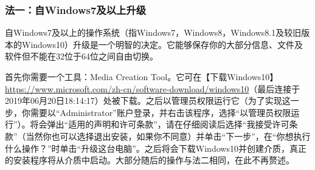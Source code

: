 \subsubsection{法一：自Windows7及以上升级}
自Windows7及以上的操作系统（指Windows7，Windows8，Windows8.1及较旧版本的Windows10）升级是一个明智的决定。它能够保存你的大部分信息、文件及软件但不能在32位于64位之间自由切换。\par
首先你需要一个工具：Media Creation Tool。它可在【下载Windows10】\url{https://www.microsoft.com/zh-cn/software-download/windows10}（最后连接于2019年06月20日18:14:17）处被下载。之后以管理员权限运行它（为了实现这一步，你需要以“Administrator”账户登录，并右击该程序，选择“以管理员权限运行”）。将会弹出“适用的声明和许可条款”，请在{\color{red}仔细阅读}后选择“我接受许可条款”（当然你也可以选择退出安装，如果你不同意）并单击“下一步”，在“你想执行什么操作？”时单击“升级这台电脑”。之后将会下载Windows10并创建介质，真正的安装程序将从介质中启动。大部分随后的操作与法二相同，在此不再赘述。
